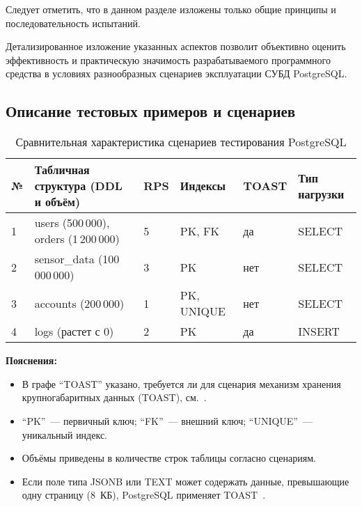 Следует отметить, что в данном разделе изложены только общие принципы и последовательность испытаний. 

Детализированное изложение указанных аспектов позволит объективно оценить эффективность и практическую значимость 
разрабатываемого программного средства в условиях разнообразных сценариев эксплуатации СУБД PostgreSQL.

\subsection{Описание тестовых примеров и сценариев}

\begin{table}[htbp]
    \centering
    \captionsetup{justification=centering}
    \caption{Сравнительная характеристика сценариев тестирования PostgreSQL}
    \label{tab:scenarios_short}
    \begin{tabular}{|l|>{\raggedright}p{4.2cm}|l|l|l|l|}
        \hline
        № & Табличная структура (DDL и объём)    & RPS & Индексы & TOAST & Тип нагрузки \\
        \hline
        1 & users (500\,000), orders (1\,200\,000) & 5 & PK, FK & да & SELECT \\ \hline
        2 & sensor\_data (100\,000\,000) & 3 & PK & нет & SELECT \\ \hline
        3 & accounts (200\,000) & 1 & PK, UNIQUE & нет & SELECT \\ \hline
        4 & logs (растет с 0) & 2 & PK & да & INSERT \\ \hline
    \end{tabular}
    \vspace{0.5em}
\end{table}

\textbf{Пояснения:}
\begin{itemize}
    \item В графе ``TOAST'' указано, требуется ли для сценария механизм хранения крупногабаритных данных (TOAST), см.~\cite{postgres_toast}.
    \item ``PK''~--- первичный ключ; ``FK''~--- внешний ключ; ``UNIQUE''~--- уникальный индекс.
    \item Объёмы приведены в количестве строк таблицы согласно сценариям.
    \item Если поле типа JSONB или TEXT может содержать данные, превышающие одну страницу (8~КБ), PostgreSQL применяет TOAST~\cite{postgres_toast,postgres_docs}.
\end{itemize}

